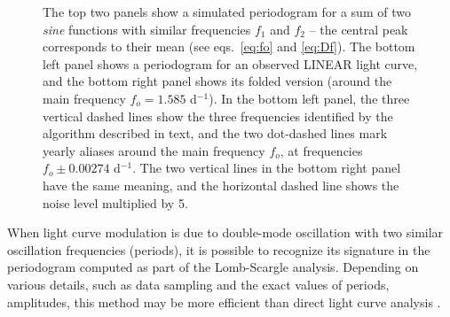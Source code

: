 \begin{figure}[ht]
  \centering
  \caption{The top two panels show a simulated periodogram for a sum of two {\it sine} functions with similar frequencies
    $f_1$ and  $f_2$ --   the central peak corresponds to their mean (see eqs.~\ref{eq:fo} and \ref{eq:Df}).
    The bottom left panel shows a periodogram for an observed LINEAR light curve, and the bottom right panel shows its
    folded version (around the main frequency $f_o=1.585$ d$^{-1}$). In the bottom left panel, the three vertical dashed
    lines show the three  frequencies identified by the algorithm described in text, and the two dot-dashed lines mark
    yearly aliases around the main frequency $f_o$, at frequencies $f_o \pm 0.00274$ d$^{-1}$. The two vertical lines in the
    bottom right panel have the same meaning, and the horizontal dashed line shows the noise level multiplied by 5.}
\label{fig:periodogram}
\end{figure}

  
When light curve modulation is due to double-mode oscillation with two similar oscillation frequencies (periods),
it is possible to recognize its signature in the periodogram computed as part of the Lomb-Scargle analysis. Depending
on various details, such as data sampling and the exact values of periods, amplitudes, this method may be
more efficient than direct light curve analysis \citep{2020MNRAS.494.1237S}. 


